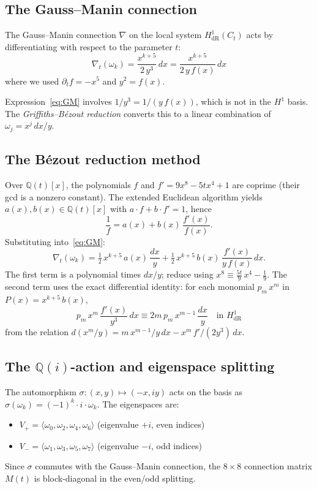 \documentclass[11pt]{article}
\theoremstyle{plain}
\theoremstyle{definition}
\theoremstyle{remark}
\newcommand{\Q}{\mathbb{Q}}
\begin{document}
\subsection{The Gauss--Manin connection}

The Gauss--Manin connection $\nabla$ on the local system $H^1_{\mathrm{dR}}(C_t)$
acts by differentiating with respect to the parameter $t$:
\begin{equation}\label{eq:GM}
\nabla_t(\omega_k) = \frac{x^{k+5}}{2\,y^3}\, dx
= \frac{x^{k+5}}{2\,y\, f(x)}\, dx
\end{equation}
where we used $\partial_t f = -x^5$ and $y^2 = f(x)$.

Expression~\eqref{eq:GM} involves $1/y^3 = 1/(y\, f(x))$, which is not
in the $H^1$ basis. The \emph{Griffiths--B\'ezout reduction} converts this
to a linear combination of $\omega_j = x^j\, dx/y$.

\subsection{The B\'ezout reduction method}

Over $\Q(t)[x]$, the polynomials $f$ and $f' = 9x^8 - 5tx^4 + 1$ are
coprime (their gcd is a nonzero constant). The extended Euclidean algorithm
yields $a(x), b(x) \in \Q(t)[x]$ with $a \cdot f + b \cdot f' = 1$, hence
\begin{equation}\label{eq:bezout}
\frac{1}{f} = a(x) + b(x)\, \frac{f'(x)}{f(x)}.
\end{equation}
Substituting into~\eqref{eq:GM}:
\[
\nabla_t(\omega_k) = \tfrac{1}{2}\, x^{k+5}\, a(x)\,\frac{dx}{y}
+ \tfrac{1}{2}\, x^{k+5}\, b(x)\, \frac{f'(x)}{y\, f(x)}\, dx.
\]
The first term is a polynomial times $dx/y$; reduce using $x^8 \equiv
\tfrac{5t}{9}\, x^4 - \tfrac{1}{9}$. The second term uses the exact
differential identity: for each monomial $p_m\, x^m$ in $P(x) = x^{k+5}\, b(x)$,
\[
p_m\, x^m\, \frac{f'(x)}{y^3}\, dx \equiv 2m\, p_m\, x^{m-1}\,\frac{dx}{y}
\quad \text{in } H^1_{\mathrm{dR}}
\]
from the relation $d(x^m/y) = m\, x^{m-1}/y\, dx - x^m\, f'/(2y^3)\, dx$.

\subsection{The $\Q(i)$-action and eigenspace splitting}

The automorphism $\sigma: (x,y) \mapsto (-x, iy)$ acts on the basis as
$\sigma(\omega_k) = (-1)^k \cdot i \cdot \omega_k$. The eigenspaces are:
\begin{itemize}[nosep]
\item $V_+ = \langle \omega_0, \omega_2, \omega_4, \omega_6 \rangle$
  (eigenvalue $+i$, even indices)
\item $V_- = \langle \omega_1, \omega_3, \omega_5, \omega_7 \rangle$
  (eigenvalue $-i$, odd indices)
\end{itemize}
Since $\sigma$ commutes with the Gauss--Manin connection, the $8 \times 8$
connection matrix $M(t)$ is block-diagonal in the even/odd splitting.
\end{document}
